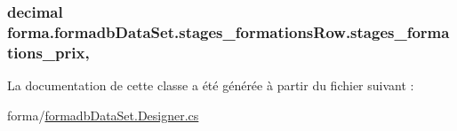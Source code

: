 \subsubsection[{\texorpdfstring{stages\+\_\+formations\+\_\+prix}{stages_formations_prix}}]{\setlength{\rightskip}{0pt plus 5cm}decimal forma.\+formadb\+Data\+Set.\+stages\+\_\+formations\+Row.\+stages\+\_\+formations\+\_\+prix\hspace{0.3cm}{\ttfamily [get]}, {\ttfamily [set]}}\hypertarget{classforma_1_1formadb_data_set_1_1stages__formations_row_a99e91b9a5a2a7e8a96a15722d2f5aadb}{}\label{classforma_1_1formadb_data_set_1_1stages__formations_row_a99e91b9a5a2a7e8a96a15722d2f5aadb}


La documentation de cette classe a été générée à partir du fichier suivant \+:\begin{DoxyCompactItemize}
\item 
forma/\hyperlink{formadb_data_set_8_designer_8cs}{formadb\+Data\+Set.\+Designer.\+cs}\end{DoxyCompactItemize}
